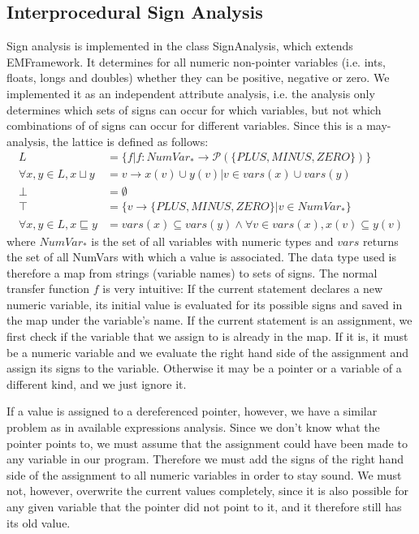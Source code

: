 \documentclass[a4paper,11pt]{article}
\begin{document}
\subsection{Interprocedural Sign Analysis}
Sign analysis is implemented in the class SignAnalysis, which extends EMFramework. It determines for all numeric non-pointer variables (i.e. ints, floats, longs and doubles) whether they can be positive, negative or zero. We implemented it as an independent attribute analysis, i.e. the analysis only determines which sets of signs can occur for which variables, but not which combinations of of signs can occur for different variables. Since this is a may-analysis, the lattice is defined as follows:
\begin{align*}
  L &= \{ f | f: \textbf{$NumVar_*$} \rightarrow \mathcal{P}(\{PLUS, MINUS, ZERO\}) \} \\
  \forall x, y \in L, x \sqcup y &= {v \rightarrow x(v) \cup y(v) | v \in vars(x) \cup vars(y) } \\
  \bot  &= \emptyset\\
  \top &= \{ v \rightarrow \{PLUS, MINUS, ZERO\}| v \in \textbf{$NumVar_*$}\} \\
  \forall x, y \in L, x \sqsubseteq y &= vars(x) \subseteq vars(y) \land \forall v \in vars(x), x(v) \subseteq y(v)
\end{align*}
\noindent where $NumVar_*$ is the set of all variables with numeric types and $vars$ returns the set of all NumVars with which a value is associated. The data type used is therefore a map from strings (variable names) to sets of signs.
The normal transfer function $f$ is very intuitive: If the current statement declares a new numeric variable, its initial value is evaluated for its possible signs and saved in the map under the variable's name. If the current statement is an assignment, we first check if the variable that we assign to is already in the map. If it is, it must be a numeric variable and we evaluate the right hand side of the assignment and assign its signs to the variable. Otherwise it may be a pointer or a variable of a different kind, and we just ignore it. 

If a value is assigned to a dereferenced pointer, however, we have a similar problem as in available expressions analysis. Since we don't know what the pointer points to, we must assume that the assignment could have been made to any variable in our program. Therefore we must add the signs of the right hand side of the assignment to all numeric variables in order to stay sound. We must not, however, overwrite the current values completely, since it is also possible for any given variable that the pointer did not point to it, and it therefore still has its old value.
\end{document}
